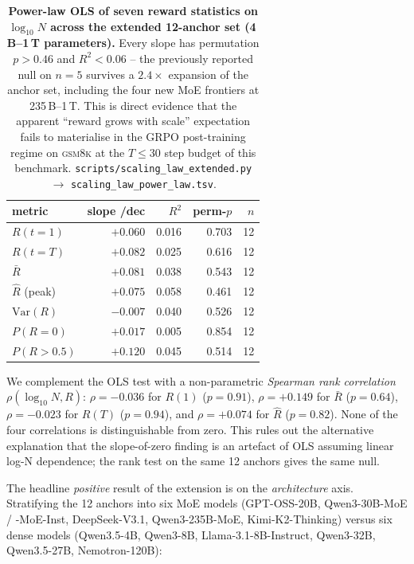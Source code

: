 \documentclass{article}
\begin{document}
\begin{table}[t]
  \centering
  \small
  \begin{tabular}{lrrrr}
    \toprule
    metric & slope /dec & $R^2$ & perm-$p$ & $n$ \\
    \midrule
    $R(t\!=\!1)$           & $+0.060$ & 0.016 & 0.703 & 12 \\
    $R(t\!=\!T)$           & $+0.082$ & 0.025 & 0.616 & 12 \\
    $\bar R$                & $+0.081$ & 0.038 & 0.543 & 12 \\
    $\hat R$ (peak)         & $+0.075$ & 0.058 & 0.461 & 12 \\
    $\text{Var}(R)$         & $-0.007$ & 0.040 & 0.526 & 12 \\
    $P(R{=}0)$              & $+0.017$ & 0.005 & 0.854 & 12 \\
    $P(R{>}0.5)$            & $+0.120$ & 0.045 & 0.514 & 12 \\
    \bottomrule
  \end{tabular}
  \caption{\textbf{Power-law OLS of seven reward statistics on
    $\log_{10} N$ across the extended 12-anchor set
    (4\,B--1\,T parameters).}  Every slope has
    permutation $p > 0.46$ and $R^2 < 0.06$ -- the previously
    reported null on $n = 5$ survives a $2.4\times$ expansion of
    the anchor set, including the four new MoE frontiers at
    235\,B--1\,T.  This is direct evidence that the apparent
    ``reward grows with scale'' expectation fails to materialise in
    the GRPO post-training regime on \textsc{gsm8k} at the
    $T \le 30$ step budget of this benchmark.  \texttt{scripts/scaling\_law\_extended.py}
    $\to$ \texttt{scaling\_law\_power\_law.tsv}.}
  \label{tab:scaling-powerlaw}
\end{table}

We complement the OLS test with a non-parametric
\emph{Spearman rank correlation} $\rho(\log_{10}N, R)$:
$\rho = -0.036$ for $R(1)$ ($p = 0.91$), $\rho = +0.149$ for
$\bar R$ ($p = 0.64$), $\rho = -0.023$ for $R(T)$ ($p = 0.94$),
and $\rho = +0.074$ for $\hat R$ ($p = 0.82$).  None of the four
correlations is distinguishable from zero.  This rules out the
alternative explanation that the slope-of-zero finding is an
artefact of OLS assuming linear log-N dependence; the rank test
on the same 12 anchors gives the same null.

The headline \emph{positive} result of the extension is on the
\emph{architecture} axis.  Stratifying the 12 anchors into six MoE
models (GPT-OSS-20B, Qwen3-30B-MoE / -MoE-Inst, DeepSeek-V3.1,
Qwen3-235B-MoE, Kimi-K2-Thinking) versus six dense models
(Qwen3.5-4B, Qwen3-8B, Llama-3.1-8B-Instruct, Qwen3-32B,
Qwen3.5-27B, Nemotron-120B):
\end{document}
